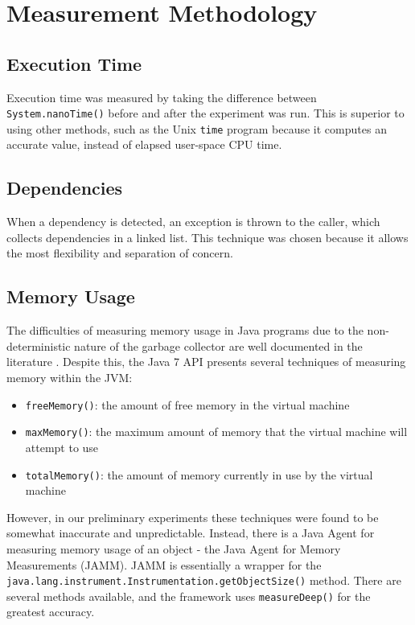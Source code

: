 \section{Measurement Methodology} \label{sec:methodology/measurements}
	\subsection{Execution Time} \label{sec:methodology/measurements/time}
	Execution time was measured by taking the difference between \texttt{System.nanoTime()} before and after the experiment was run. This is superior to using other methods, such as the Unix \texttt{time} program because it computes an accurate value, instead of elapsed user-space CPU time.
	
	\subsection{Dependencies} \label{sec:methodology/measurements/dependencies}
	When a dependency is detected, an exception is thrown to the caller, which collects dependencies in a linked list. This technique was chosen because it allows the most flexibility and separation of concern.
	
	\subsection{Memory Usage} \label{sec:methodology/measurements/memory}
	The difficulties of measuring memory usage in Java programs due to the non-deterministic nature of the garbage collector are well documented in the literature \citep{Kim2000,Ogata2010}. Despite this, the Java 7 API presents several techniques \citep{RuntimeDocs} of measuring memory within the JVM:
	
	\begin{itemize}
		\item \texttt{freeMemory()}: the amount of free memory in the virtual machine
		\item \texttt{maxMemory()}: the maximum amount of memory that the virtual machine will attempt to use
		\item \texttt{totalMemory()}: the amount of memory currently in use by the virtual machine
	\end{itemize}
	
	However, in our preliminary experiments these techniques were found to be somewhat inaccurate and unpredictable. Instead, there is a Java Agent for measuring memory usage of an object - the Java Agent for Memory Measurements \citep{JAMM} (JAMM). JAMM is essentially a wrapper for the
	\\\texttt{java.lang.instrument.Instrumentation.getObjectSize()} method. There are several methods available, and the framework uses \texttt{measureDeep()} for the greatest accuracy.
	
